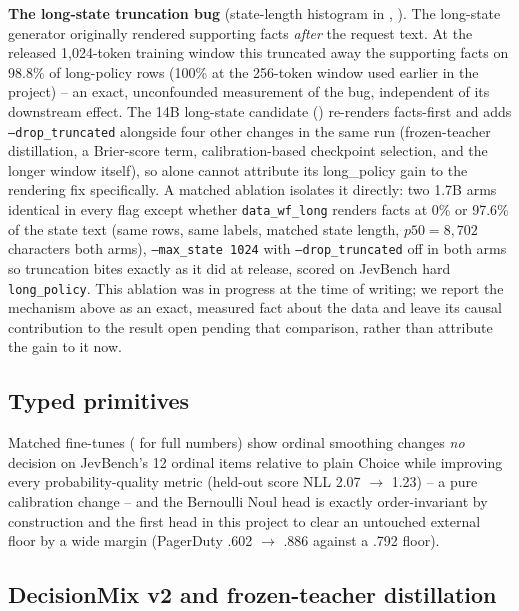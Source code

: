 \textbf{The long-state truncation bug} (state-length histogram in ,
). The long-state generator originally rendered supporting facts \emph{after} the
request text. At the released 1{,}024-token training window this truncated away the supporting facts on
98.8\% of long-policy rows (100\% at the 256-token window used earlier in the project) -- an exact,
unconfounded measurement of the bug, independent of its downstream effect. The 14B long-state candidate
() re-renders facts-first and adds \texttt{--drop\_truncated} alongside four other
changes in the same run (frozen-teacher distillation, a Brier-score term, calibration-based checkpoint
selection, and the longer window itself), so  alone cannot attribute its long\_policy gain
to the rendering fix specifically. A matched ablation isolates it directly: two 1.7B arms identical in
every flag except whether \texttt{data\_wf\_long} renders facts at 0\% or 97.6\% of the state text (same
rows, same labels, matched state length, $p50 = 8{,}702$ characters both arms), \texttt{--max\_state 1024}
with \texttt{--drop\_truncated} off in both arms so truncation bites exactly as it did at release, scored
on JevBench hard \texttt{long\_policy}. This ablation was in progress at the time of writing; we report the
mechanism above as an exact, measured fact about the data and leave its causal contribution to the
 result open pending that comparison, rather than attribute the gain to it now.

\subsection{Typed primitives}
\label{sec:results:typed}

Matched fine-tunes ( for full numbers) show ordinal smoothing changes
\emph{no} decision on JevBench's 12 ordinal items relative to plain Choice while improving every
probability-quality metric (held-out score NLL 2.07 $\to$ 1.23) -- a pure calibration change -- and the
Bernoulli Noul head is exactly order-invariant by construction and the first head in this project to clear
an untouched external floor by a wide margin (PagerDuty .602 $\to$ .886 against a .792 floor).

\subsection{DecisionMix v2 and frozen-teacher distillation}
\label{sec:results:kd}

